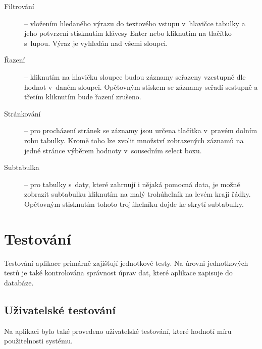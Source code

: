 \documentclass[thesis=B,czech]{FITthesis}[2012/06/26]
\begin{document}
\begin{description}
		\item[Filtrování] -- vložením hledaného výrazu do textového vstupu v~hlavičce tabulky a jeho potvrzení stisknutím klávesy Enter nebo kliknutím na tlačítko s~lupou. Výraz je vyhledán nad všemi sloupci.
		\item[Řazení] -- kliknutím na hlavičku sloupce budou záznamy seřazeny vzestupně dle hodnot v~daném sloupci. Opětovným stiskem se záznamy seřadí sestupně a třetím kliknutím bude řazení zrušeno.
		\item[Stránkování] -- pro procházení stránek se záznamy jsou určena tlačítka v~pravém dolním rohu tabulky. Kromě toho lze zvolit množství zobrazených záznamů na jedné stránce výběrem hodnoty v~sousedním select boxu.
		\item[Subtabulka] -- pro tabulky s~daty, které zahrnují i nějaká pomocná data, je možné zobrazit subtabulku kliknutím na malý trohúhelník na levém kraji řádky. Opětovným stisknutím tohoto trojúhelníku dojde ke skrytí subtabulky.
	\end{description}

\chapter{Testování}
	Testování aplikace primárně zajišťují jednotkové testy. Na úrovni jednotkových testů je také kontrolována správnost úprav dat, které aplikace zapisuje do databáze. 
\section{Uživatelské testování}	
	Na aplikaci bylo také provedeno uživatelské testování, které hodnotí míru použitelnosti systému. 
\end{document}
